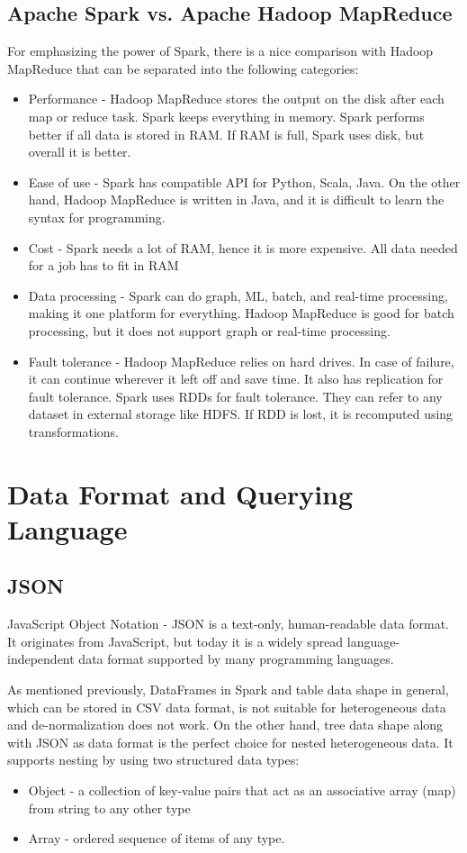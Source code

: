 \subsection{Apache Spark vs. Apache Hadoop MapReduce}
For emphasizing the power of Spark, there is a nice comparison with Hadoop MapReduce that can be separated into the following categories: 
\begin{itemize}
	\item Performance - Hadoop MapReduce stores the output on the disk after each map or reduce task. Spark keeps everything in memory. Spark performs better if all data is stored in RAM. If RAM is full, Spark uses disk, but overall it is better.
	\item Ease of use - Spark has compatible API for Python, Scala, Java. On the other hand, Hadoop MapReduce is written in Java, and it is difficult to learn the syntax for programming. 
	\item Cost - Spark needs a lot of RAM, hence it is more expensive. All data needed for a job has to fit in RAM
	\item Data processing - Spark can do graph, ML, batch, and real-time processing, making it one platform for everything. Hadoop MapReduce is good for batch processing, but it does not support graph or real-time processing. 
	\item Fault tolerance - Hadoop MapReduce relies on hard drives. In case of failure, it can continue wherever it left off and save time. It also has replication for fault tolerance. Spark uses RDDs for fault tolerance. They can refer to any dataset in external storage like HDFS. If RDD is lost, it is recomputed using transformations.
\end{itemize}

\section{Data Format and Querying Language}
\subsection{JSON}
\label{sec:JSON}
JavaScript Object Notation - JSON \cite{JSON} is a text-only, human-readable data format. It originates from JavaScript, but today it is a widely spread language-independent data format supported by many programming languages. 

As mentioned previously, DataFrames in Spark and table data shape in general, which can be stored in CSV data format, is not suitable for heterogeneous data and de-normalization does not work. On the other hand, tree data shape along with JSON as data format is the perfect choice for nested heterogeneous data. It supports nesting by using two structured data types:
\begin{itemize}
	\item Object - a collection of key-value pairs that act as an associative array (map) from string to any other type 
	\item Array - ordered sequence of items of any type. 
\end{itemize} 

